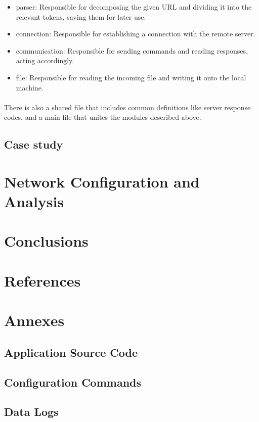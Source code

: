 \documentclass[11pt]{article}
\begin{document}
\begin{itemize}
    \item{parser: Responsible for decomposing the given URL and dividing it into the relevant tokens, saving them for later use.}
    \item{connection: Responsible for establishing a connection with the remote server.}
    \item{communication: Responsible for sending commands and reading responses, acting accordingly.}
    \item{file: Responsible for reading the incoming file and writing it onto the local machine.}
\end{itemize}

\paragraph{}There is also a shared file that includes common definitions like server response codes, and a main file that unites the modules described above.

\subsection*{Case study}

\section*{Network Configuration and Analysis}

\section*{Conclusions}

\section*{References}

\section*{Annexes}

\subsection*{Application Source Code}

\subsection*{Configuration Commands}

\subsection*{Data Logs}
\end{document}
